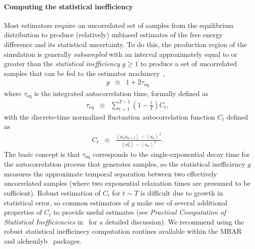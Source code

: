 \documentclass[9pt,bestpractices]{livecoms}
\newcommand{\expect}[1]{\left\langle{#1}\right\rangle}
\begin{document}
\paragraph{Computing the statistical inefficiency}
Most estimators require an uncorrelated set of samples from the equilibrium distribution to produce (relatively) unbiased estimates of the free energy difference and its statistical uncertainty.
To do this, the production region of the simulation is generally \emph{subsampled} with an interval approximately equal to or greater than the \emph{statistical inefficiency} $g \ge 1$ to produce a set of uncorrelated samples that can be fed to the estimator machinery~\cite{chodera2016simple},
\begin{eqnarray}
g &\equiv& 1 + 2 \tau_\mathrm{eq} \label{eq:statistical-inefficiency-definition}
\end{eqnarray}
where $\tau_\mathrm{eq}$ is the integrated autocorrelation time, formally defined as
\begin{eqnarray}
\tau_\mathrm{eq} &\equiv& \sum_{t=1}^{T-1} \left(1 - \frac{t}{T}\right) C_t \label{eq:integrated-autocorrelation-time-definition} , 
\end{eqnarray}
with the discrete-time normalized fluctuation autocorrelation function $C_t$ defined as
\begin{eqnarray}
C_t &\equiv& \frac{\expect{a_n a_{n+t}} - \expect{a_n}^2}{\expect{a_n^2} - \expect{a_n}^2} . \label{equation:autocorrelation-definition}
\end{eqnarray}
The basic concept is that $\tau_\mathrm{eq}$ corresponds to the single-exponential decay time for the autocorrelation process that generates samples, so the statistical inefficiency $g$ measures the approximate temporal separation between two effectively uncorrelated samples (where two exponential relaxation times are presumed to be sufficient).
%
Robust estimation of $C_t$ for $t \sim T$ is difficult due to growth in statistical error, so common estimators of $g$ make use of several additional properties of $C_t$ to provide useful estimates (see \emph{Practical Computation of Statistical Inefficiencies} in~\cite{chodera2016simple} for a detailed discussion).
We recommend using the robust statistical inefficinecy computation routines available within the MBAR~\cite{kylebeauchamp2019choderalab} and alchemlyb~\cite{daviddotson2019alchemistry} packages.
%
\end{document}
